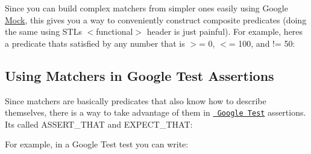 Since you can build complex matchers from simpler ones easily using Google \mbox{\hyperlink{class_mock}{Mock}}, this gives you a way to conveniently construct composite predicates (doing the same using S\+TL\textquotesingle{}s {\ttfamily $<$functional$>$} header is just painful). For example, here\textquotesingle{}s a predicate that\textquotesingle{}s satisfied by any number that is $>$= 0, $<$= 100, and != 50\+:


\begin{DoxyCode}{0}
\end{DoxyCode}


\subsection*{Using Matchers in Google Test Assertions}

Since matchers are basically predicates that also know how to describe themselves, there is a way to take advantage of them in \href{../../googletest/}{\texttt{ Google Test}} assertions. It\textquotesingle{}s called {\ttfamily A\+S\+S\+E\+R\+T\+\_\+\+T\+H\+AT} and {\ttfamily E\+X\+P\+E\+C\+T\+\_\+\+T\+H\+AT}\+:


\begin{DoxyCode}{0}
\end{DoxyCode}


For example, in a Google Test test you can write\+:


